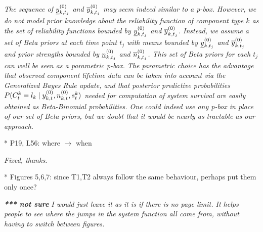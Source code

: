 \documentclass[12pt, a4paper]{elsarticle}
\begin{document}
\medskip
\emph{The sequence of $\underline{y}^{(0)}_{k,t_j}$ and $\overline{y}^{(0)}_{k,t_j}$ may seem indeed similar to a p-box.
However, we do not model prior knowledge about the reliability function of component type $k$
as the set of reliability functions bounded by $\underline{y}^{(0)}_{k,t_j}$ and $\overline{y}^{(0)}_{k,t_j}$.
Instead, we assume a set of Beta priors at each time point $t_j$ with means bounded by $\underline{y}^{(0)}_{k,t_j}$ and $\overline{y}^{(0)}_{k,t_j}$
and prior strengths bounded by $\underline{n}^{(0)}_{k,t_j}$ and $\overline{n}^{(0)}_{k,t_j}$.
This set of Beta priors for each $t_j$ can well be seen as a parametric p-box.
The parametric choice has the advantage that observed component lifetime data can be taken into account via the Generalized Bayes Rule update,
and that posterior predictive probabilities $P(C^k_t = l_k \mid y^{(0)}_{k,t}, n^{(0)}_{k,t}, s^k_t)$ needed for computation of system survival
are easily obtained as Beta-Binomial probabilities.
One could indeed use any p-box in place of our set of Beta priors,
but we doubt that it would be nearly as tractable as our approach.
}
\medskip

* P19, L56: where $\to$ when

\medskip
\emph{Fixed, thanks.}
\medskip

* Figures 5,6,7: since T1,T2 always follow the same behaviour, perhaps put them only once?

\medskip
\emph{\textbf{*** not sure} I would just leave it as it is if there is no page limit.
It helps people to see where the jumps in the system function all come from, without having to switch between figures.}
\medskip
\end{document}
